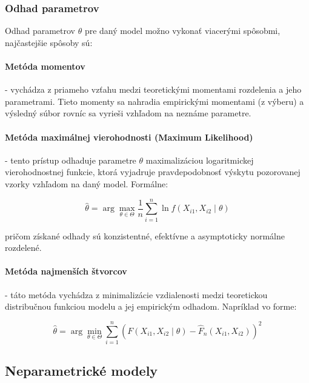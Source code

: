 \subsubsection{Odhad parametrov}\label{subsubsec:param_estimation}

Odhad parametrov $\theta$ pre daný model možno vykonať viacerými spôsobmi, najčastejšie spôsoby sú:

\paragraph{Metóda momentov} - vychádza z priameho vzťahu medzi teoretickými momentami rozdelenia a jeho parametrami. Tieto momenty sa nahradia empirickými momentami (z výberu) a výsledný súbor rovníc sa vyrieši vzhľadom na neznáme parametre.

\paragraph{Metóda maximálnej vierohodnosti (Maximum Likelihood)} - tento prístup odhaduje parametre $\theta$ maximalizáciou logaritmickej vierohodnostnej funkcie, ktorá vyjadruje pravdepodobnosť výskytu pozorovanej vzorky vzhľadom na daný model. Formálne:

\begin{equation}
\hat{\theta} = \arg\max_{\theta \in \Theta} \frac{1}{n} \sum_{i=1}^{n} \ln f(X_{i1}, X_{i2} \mid \theta)
\end{equation}

pričom získané odhady sú konzistentné, efektívne a asymptoticky normálne rozdelené.

\paragraph{Metóda najmenších štvorcov} - táto metóda vychádza z minimalizácie vzdialenosti medzi teoretickou distribučnou funkciou modelu a jej empirickým odhadom. Napríklad vo forme:

\begin{equation}
\hat{\theta} = \arg\min_{\theta \in \Theta} \sum_{i=1}^{n} \left( F(X_{i1}, X_{i2} \mid \theta) - \hat{F}_n(X_{i1}, X_{i2}) \right)^2
\end{equation}

\subsection{Neparametrické modely}\label{subsec:joint_nonparam_models}

